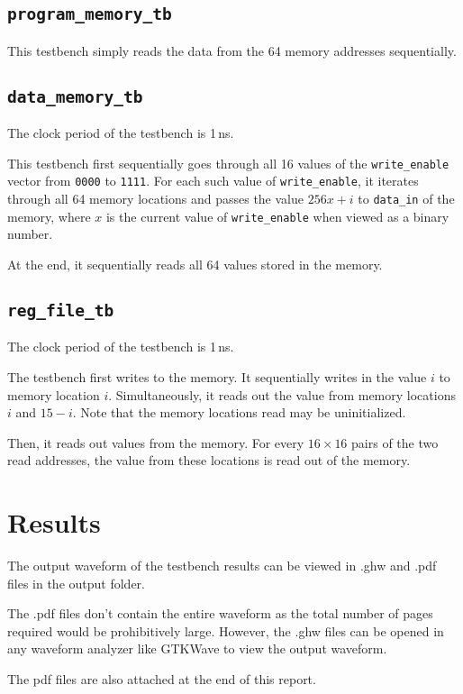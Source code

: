 \documentclass[a4paper]{scrartcl}
\renewcommand{\tt}{\texttt}
\begin{document}
\subsection*{\tt{program_memory_tb}}
This testbench simply reads the data from the 64 memory addresses sequentially.

\subsection*{\tt{data_memory_tb}}
The clock period of the testbench is 1\,ns.

This testbench first sequentially goes through all 16 values of the \tt{write_enable} vector from \tt{0000} to \tt{1111}. For each such value of \tt{write_enable}, it iterates through all 64 memory locations and passes the value $256x + i$ to \tt{data_in} of the memory, where $x$ is the current value of \tt{write_enable} when viewed as a binary number.

At the end, it sequentially reads all 64 values stored in the memory.

\subsection*{\tt{reg_file_tb}}
The clock period of the testbench is 1\,ns.

The testbench first writes to the memory. It sequentially writes in the value $i$ to memory location $i$. Simultaneously, it reads out the value from memory locations $i$ and $15 - i$. Note that the memory locations read may be uninitialized.

Then, it reads out values from the memory. For every $16 \times 16$ pairs of the two read addresses, the value from these locations is read out of the memory.

\section{Results}
The output waveform of the testbench results can be viewed in .ghw and .pdf files in the output folder.

The .pdf files don't contain the entire waveform as the total number of pages required would be prohibitively large. However, the .ghw files can be opened in any waveform analyzer like GTKWave to view the output waveform.

The pdf files are also attached at the end of this report.





\end{document}
